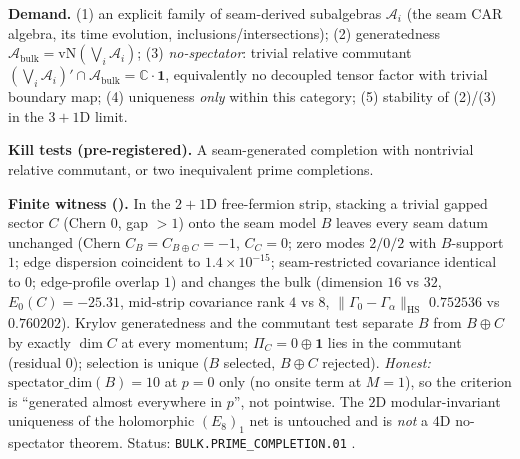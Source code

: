 \par\smallskip\noindent\textbf{Demand.} (1) an explicit family of seam-derived subalgebras
$\mathcal A_i$ (the seam CAR algebra, its time evolution, inclusions/intersections);
(2) generatedness $\mathcal A_{\mathrm{bulk}}=\mathrm{vN}(\bigvee_i\mathcal A_i)$;
(3) \emph{no-spectator}: trivial relative commutant
$(\bigvee_i\mathcal A_i)'\cap\mathcal A_{\mathrm{bulk}}=\mathbb C\cdot\mathbf 1$,
equivalently no decoupled tensor factor with trivial boundary map; (4) uniqueness
\emph{only} within this category; (5) stability of (2)/(3) in the $3{+}1$D limit.

\par\smallskip\noindent\textbf{Kill tests (pre-registered).} A seam-generated completion
with nontrivial relative commutant, or two inequivalent prime completions.

\par\smallskip\noindent\textbf{Finite witness ().}
In the $2{+}1$D free-fermion strip, stacking a trivial gapped sector $C$ (Chern $0$,
gap $>1$) onto the seam model $B$ leaves every seam datum unchanged (Chern
$C_B=C_{B\oplus C}=-1$, $C_C=0$; zero modes $2/0/2$ with $B$-support $1$; edge
dispersion coincident to $1.4{\times}10^{-15}$; seam-restricted covariance identical to
$0$; edge-profile overlap $1$) and changes the bulk (dimension $16$ vs $32$,
$E_0(C)=-25.31$, mid-strip covariance rank $4$ vs $8$,
$\|\Gamma_0-\Gamma_\alpha\|_{\mathrm{HS}}$ $0.752536$ vs $0.760202$).  Krylov
generatedness and the commutant test separate $B$ from $B\oplus C$ by exactly $\dim C$
at every momentum; $\Pi_C=0\oplus\mathbf 1$ lies in the commutant (residual $0$); selection
is unique ($B$ selected, $B\oplus C$ rejected).  \emph{Honest:}
$\mathrm{spectator\_dim}(B)=10$ at $p=0$ only (no onsite term at $M=1$), so the
criterion is ``generated almost everywhere in $p$'', not pointwise.  The $2$D
modular-invariant uniqueness of the holomorphic $(E_8)_1$ net is untouched and is
\emph{not} a $4$D no-spectator theorem.  Status: \texttt{BULK.PRIME\_COMPLETION.01} \mO.

